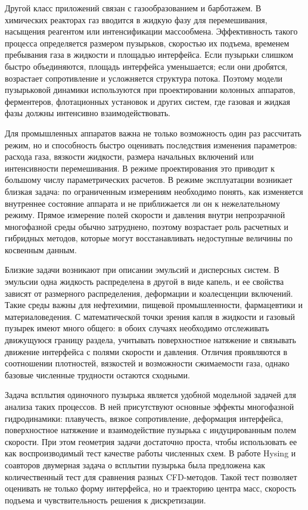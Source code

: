 \documentclass[12pt,a4paper]{article}
\begin{document}
Другой класс приложений связан с газообразованием и барботажем. В химических
реакторах газ вводится в жидкую фазу для перемешивания, насыщения реагентом или
интенсификации массообмена. Эффективность такого процесса определяется
размером пузырьков, скоростью их подъема, временем пребывания газа в жидкости и
площадью интерфейса. Если пузырьки слишком быстро объединяются,
площадь интерфейса уменьшается; если они дробятся, возрастает сопротивление и
усложняется структура потока. Поэтому модели пузырьковой динамики используются
при проектировании колонных аппаратов, ферментеров, флотационных установок и
других систем, где газовая и жидкая фазы должны интенсивно взаимодействовать.

Для промышленных аппаратов важна не только возможность один раз рассчитать
режим, но и способность быстро оценивать последствия изменения параметров:
расхода газа, вязкости жидкости, размера начальных включений или интенсивности
перемешивания. В режиме проектирования это приводит к большому числу
параметрических расчетов. В режиме эксплуатации возникает близкая задача: по
ограниченным измерениям необходимо понять, как изменяется внутреннее состояние
аппарата и не приближается ли он к нежелательному режиму. Прямое измерение
полей скорости и давления внутри непрозрачной многофазной среды обычно
затруднено, поэтому возрастает роль расчетных и гибридных методов, которые
могут восстанавливать недоступные величины по косвенным данным.

Близкие задачи возникают при описании эмульсий и дисперсных систем. В эмульсии
одна жидкость распределена в другой в виде капель, и ее свойства зависят от
размерного распределения, деформации и коалесценции включений. Такие среды
важны для нефтехимии, пищевой промышленности, фармацевтики и материаловедения.
С математической точки зрения капля в жидкости и газовый пузырек имеют много
общего: в обоих случаях необходимо отслеживать движущуюся границу раздела,
учитывать поверхностное натяжение и связывать движение интерфейса с полями
скорости и давления. Отличия проявляются в соотношении плотностей, вязкостей и
возможности сжимаемости газа, однако базовые численные трудности остаются
сходными.

Задача всплытия одиночного пузырька является удобной модельной задачей для
анализа таких процессов. В ней присутствуют основные эффекты многофазной
гидродинамики: плавучесть, вязкое сопротивление, деформация интерфейса,
поверхностное натяжение и взаимодействие пузырька с индуцированным полем
скорости. При этом геометрия задачи достаточно проста, чтобы использовать ее
как воспроизводимый тест качестве работы численных схем. В работе Hysing и соавторов
\cite{Hysing2009} двумерная задача о всплытии пузырька была предложена как
количественный тест для сравнения разных CFD-методов. Такой тест позволяет
оценивать не только форму интерфейса, но и траекторию центра масс, скорость
подъема и чувствительность решения к дискретизации.
\end{document}
